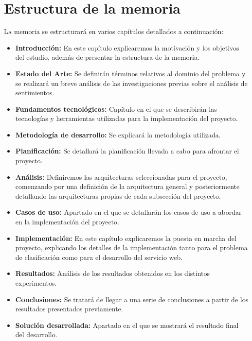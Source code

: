 
\chapter{Estructura de la memoria}

\lettrine{L}{a} memoria se estructurará en varios capítulos detallados a continuación:

\begin{itemize}
	\item \textbf{Introducción:} En este capítulo explicaremos la motivación y los objetivos del estudio, además de presentar la estructura de la memoria.
	\item \textbf{Estado del Arte:} Se definirán términos relativos al dominio del problema y se realizará un breve análisis de las investigaciones previas sobre el análisis de sentimientos.
	\item \textbf{Fundamentos tecnológicos:} Capítulo en el que se describirán las tecnologías y herramientas utilizadas para la implementación del proyecto.
	\item \textbf{Metodología de desarrollo:} Se explicará la metodología utilizada.
	\item \textbf{Planificación:} Se detallará la planificación llevada a cabo para afrontar el proyecto.
	\item \textbf{Análisis:} Definiremos las arquitecturas seleccionadas para el proyecto, comenzando por una definición de la arquitectura general y posteriormente detallando las arquitecturas propias de cada subsección del proyecto.
	\item \textbf{Casos de uso:} Apartado en el que se detallarán los casos de uso a abordar en la implementación del proyecto.
	\item \textbf{Implementación:} En este capítulo explicaremos la puesta en marcha del proyecto, explicando los detalles de la implementación tanto para el problema de clasificación como para el desarrollo del servicio web.
	\item \textbf{Resultados:} Análisis de los resultados obtenidos en los distintos experimentos.
	\item \textbf{Conclusiones:} Se tratará de llegar a una serie de conclusiones a partir de los resultados presentados previamente.
	\item \textbf{Solución desarrollada:} Apartado en el que se mostrará el resultado final del desarrollo.
\end{itemize}